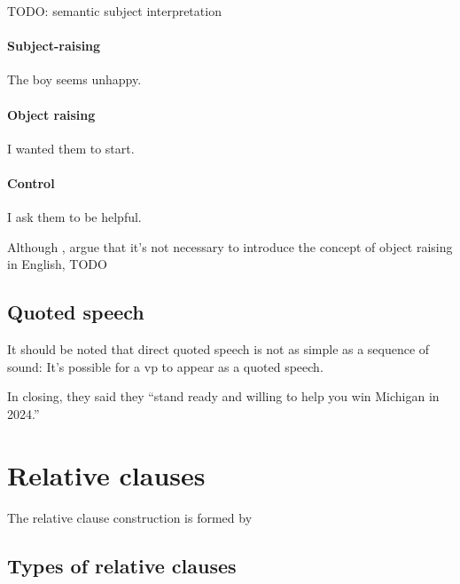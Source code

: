 \documentclass[UTF8, a4paper, oneside, scheme=plain, 12pt]{ctexbook}
\newcommand*{\citepage}[1]{p.~{#1}}
\begin{document}
TODO: semantic subject interpretation



\subsubsection{Subject-raising}

\begin{exe}
    \ex The boy seems unhappy.
\end{exe}

\subsubsection{Object raising}

\begin{exe}
    \ex I wanted them to start.
\end{exe}

\subsubsection{Control}

\begin{exe}
    \ex I ask them to be helpful.
\end{exe}

Although \citet[\citepage{15}]{dixon2005semantic}, \citet[\citepage{388}]{dixon2010basic2} argue that 
it's not necessary to introduce the concept of object raising in English, TODO

\section{Quoted speech}

It should be noted that direct quoted speech 
is not as simple as a sequence of sound:
It's possible for a \acs{vp} 
to appear as a quoted speech.

\begin{exe}
    \ex In closing, they said they ``stand ready and willing to help you win Michigan in 2024.''
\end{exe}

\chapter{Relative clauses}\label{chap:relative-clause}

The relative clause construction is formed by 

\section{Types of relative clauses}
\end{document}
